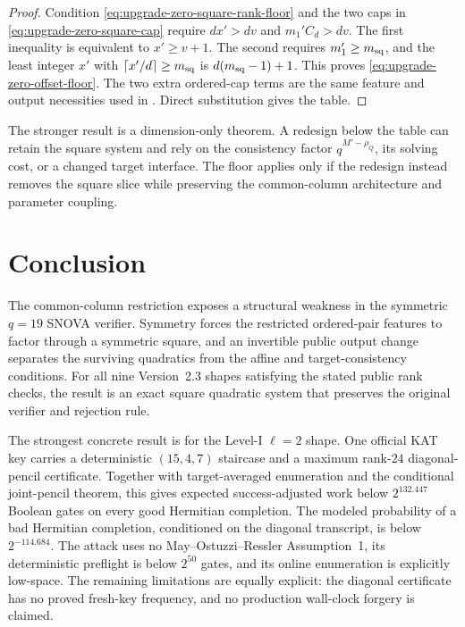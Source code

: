 \documentclass[11pt]{article}
\begin{document}
\begin{proof}
Condition \eqref{eq:upgrade-zero-square-rank-floor} and the two caps in
\eqref{eq:upgrade-zero-square-cap} require
$dx'>dv$ and $m_1'C_d>dv$.  The first inequality is equivalent to
$x'\ge v+1$.  The second requires $m_1'\ge m_{\rm sq}$, and the least integer
$x'$ with $\lceil x'/d\rceil\ge m_{\rm sq}$ is
$d(m_{\rm sq}-1)+1$.  This proves
\eqref{eq:upgrade-zero-offset-floor}.  The two extra ordered-cap terms are
the same feature and output necessities used in
.  Direct substitution gives the table.
\end{proof}

The stronger result is a dimension-only theorem.  A redesign below the table
can retain the square system and rely on the consistency factor
$q^{M'-\rho_Q}$, its solving cost, or a changed target interface.  The floor
applies only if the redesign instead removes the square slice while preserving
the common-column architecture and parameter coupling.

\section{Conclusion}\label{sec:conclusion}
The common-column restriction exposes a structural weakness in the symmetric
$q=19$ SNOVA verifier.  Symmetry forces the restricted ordered-pair features
to factor through a symmetric square, and an invertible public output change
separates the surviving quadratics from the affine and target-consistency
conditions.  For all nine Version~2.3 shapes satisfying the stated public rank
checks, the result is an exact square quadratic system that preserves the
original verifier and rejection rule.

The strongest concrete result is for the Level-I $\ell=2$ shape.  One official
KAT key carries a deterministic $(15,4,7)$ staircase and a maximum rank-$24$
diagonal-pencil certificate.  Together with target-averaged enumeration and
the conditional joint-pencil theorem, this gives expected success-adjusted
work below $2^{132.447}$ Boolean gates on every good Hermitian completion.
The modeled probability of a bad Hermitian completion, conditioned on the
diagonal transcript, is below $2^{-114.684}$.  The attack uses no
May--Ostuzzi--Ressler Assumption~1, its deterministic preflight is below
$2^{50}$ gates, and its online enumeration is explicitly low-space.  The
remaining limitations are equally explicit: the diagonal certificate has no
proved fresh-key frequency, and no production wall-clock forgery is claimed.
\end{document}
